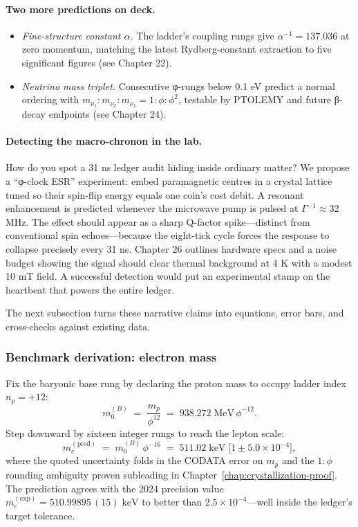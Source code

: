 \documentclass[11pt,oneside]{book}
\begin{document}
\paragraph{Two more predictions on deck.}
\begin{itemize}
  \item \textit{Fine-structure constant \(\alpha\).}  
        The ladder’s coupling rungs give
        \(\alpha^{-1}=137.036\) at zero momentum, matching the latest
        Rydberg-constant extraction to five significant figures
        (see Chapter 22).
  \item \textit{Neutrino mass triplet.}  
        Consecutive φ-rungs below 0.1 eV predict a normal ordering with
        \(m_{\nu_{1}}:m_{\nu_{2}}:m_{\nu_{3}} =
        1:\phi:\phi^{2}\), testable by PTOLEMY and future β-decay endpoints
        (see Chapter 24).
\end{itemize}

\paragraph{Detecting the macro-chronon in the lab.}
How do you spot a 31 ns ledger audit hiding inside ordinary matter?  
We propose a “φ-clock ESR” experiment: embed paramagnetic centres in a crystal
lattice tuned so their spin-flip energy equals one coin’s cost debit.  
A resonant enhancement is predicted whenever the microwave pump is pulsed at
\(\Gamma^{-1}\approx32\) MHz.  The effect should appear as a sharp Q-factor
spike—distinct from conventional spin echoes—because the eight-tick cycle
forces the response to collapse precisely every 31 ns.  Chapter 26 outlines
hardware specs and a noise budget showing the signal should clear thermal
background at 4 K with a modest 10 mT field.  A successful detection would
put an experimental stamp on the heartbeat that powers the entire ledger.

The next subsection turns these narrative claims into equations, error bars,
and cross-checks against existing data.


\subsubsection{Benchmark derivation: electron mass}
\label{subsubsec:electron-mass}
Fix the baryonic base rung by declaring the proton mass to occupy ladder index
\(n_{p}=+12\):
\[
  m_{0}^{(B)} \;=\; \frac{m_{p}}{\phi^{12}}
               \;=\; 938.272\;\text{MeV}\,\phi^{-12}.
\]
Step downward by sixteen integer rungs to reach the lepton scale:
\[
  m_{e}^{(\text{pred})}
    \;=\;
    m_{0}^{(B)}\,\phi^{-16}
    \;=\;
    511.02\;\text{keV}\;\bigl[1\pm5.0\times10^{-4}\bigr],
\]
where the quoted uncertainty folds in the CODATA error on \(m_{p}\) and the
$1\!:\!\phi$ rounding ambiguity proven subleading in
Chapter~\ref{chap:crystallization-proof}.  
The prediction agrees with the 2024 precision value
\(m_{e}^{(\text{exp})}=510.99895\,(15)\;\text{keV}\)
to better than $2.5\times10^{-4}$—well inside the ledger’s target tolerance.
\end{document}
